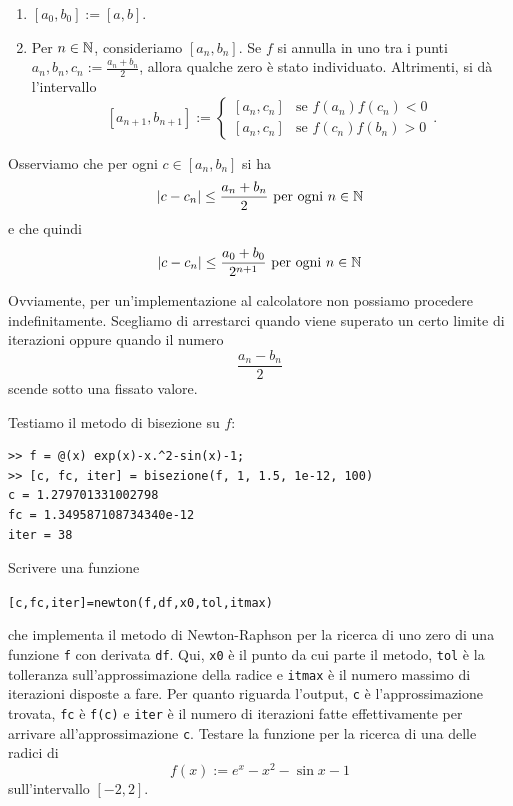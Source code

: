 \begin{enumerate}
\item \([a_0, b_0] := [a, b]\).
\item Per \(n \in \mathbb N\), consideriamo \([a_n, b_n]\). Se \(f\) si annulla in uno tra i punti \(a_n, b_n, c_n := \frac{a_n+b_n}{2}\), allora qualche zero è stato individuato. Altrimenti, si dà l'intervallo
\[[a_{n+1}, b_{n+1}] := \begin{cases} [a_n, c_n] & \text{se } f(a_n)f(c_n) < 0 \\ [a_n, c_n] & \text{se } f(c_n)f(b_n) > 0 \end{cases}.\]
\end{enumerate}

Osserviamo che per ogni \(c \in [a_n, b_n]\) si ha 
\[\lvert c-c_n \rvert \le \frac{a_n+b_n}{2} \text{ per ogni } n \in \mathbb N\]
e che quindi
\[\lvert c-c_n \rvert \le \frac{a_0+b_0}{2^{n+1}} \text{ per ogni } n \in \mathbb N\]

Ovviamente, per un'implementazione al calcolatore non possiamo procedere indefinitamente. Scegliamo di arrestarci quando viene superato un certo limite di iterazioni oppure quando il numero
\[\frac{a_n-b_n}{2}\]
scende sotto una fissato valore.



Testiamo il metodo di bisezione su \(f\):

\begin{lstlisting}[numbers=none]
>> f = @(x) exp(x)-x.^2-sin(x)-1;
>> [c, fc, iter] = bisezione(f, 1, 1.5, 1e-12, 100)
c = 1.279701331002798
fc = 1.349587108734340e-12
iter = 38
\end{lstlisting}


\begin{esercizio}
Scrivere una funzione
\begin{center}
\lstinline£[c,fc,iter]=newton(f,df,x0,tol,itmax)£
\end{center}
che implementa il metodo di \textenglish{Newton-Raphson} per la ricerca di uno zero di una funzione \lstinline£f£ con derivata \lstinline£df£. Qui, \lstinline£x0£ è il punto da cui parte il metodo, \lstinline£tol£ è la tolleranza sull'approssimazione della radice e \lstinline£itmax£ è il numero massimo di iterazioni disposte a fare. Per quanto riguarda l'output, \lstinline£c£ è l'approssimazione trovata, \lstinline£fc£ è \lstinline£f(c)£ e \lstinline£iter£ è il numero di iterazioni fatte effettivamente per arrivare all'approssimazione \lstinline£c£. Testare la funzione per la ricerca di una delle radici di
\[f(x) := e^x - x^2 - \sin x - 1\]
sull'intervallo \([-2, 2]\).
\end{esercizio}

